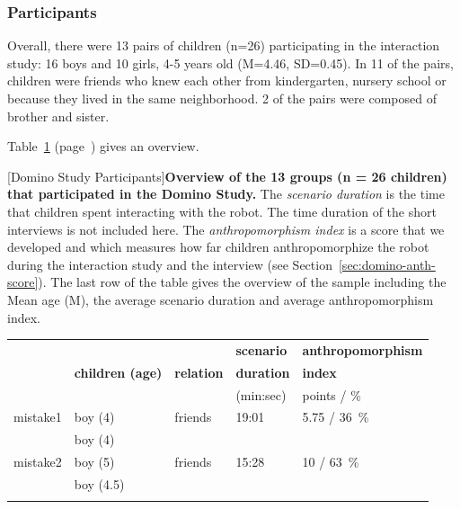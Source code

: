 \documentclass{sig-alternate}
\begin{document}
\subsubsection{Participants}

Overall, there were 13 pairs of children (n=26) participating in the interaction
study: 16 boys and 10 girls, 4-5 years old (M=4.46, SD=0.45). In 11 of the
pairs, children were friends who knew each other from kindergarten, nursery
school or because they lived in the same neighborhood. 2 of the pairs were
composed of brother and sister.

Table~\ref{tab:domino-sample} (page~\pageref{tab:domino-sample}) gives an
overview.

\begin{table}[H]
[Domino Study Participants]{\small \textbf{Overview of the 13 groups (n = 26 children) that participated in the Domino Study.} The \textit{scenario duration} is the time that children spent interacting with the robot. The time duration of the short interviews is not included here. The \textit{anthropomorphism index} is a score that we developed and which measures how far children anthropomorphize the robot during the interaction study and the interview (see Section~\ref{sec:domino-anth-score}). The last row of the table gives the overview of the sample including the Mean age (M), the average scenario duration and average anthropomorphism index.}
\label{tab:domino-sample}       %
\centering
\footnotesize

\begin{tabular}{lllll}
\hline\noalign{\smallskip}
	\multirow{3}{*}{\textbf{group}} & \multirow{3}{*}{\textbf{children (age)}} & \multirow{3}{*}{\textbf{relation}} & \textbf{scenario} & \textbf{anthropomorphism} \\
	 & & & \textbf{duration} & \textbf{index} \\
	 & & & (min:sec) & points / \% \\
\noalign{\smallskip}\hline\hline\noalign{\smallskip}

	mistake1 & boy (4) & friends & 19:01 & 5.75 / 36~\% \\ 
	& boy (4) & & & \\ 
\noalign{\smallskip} \hline \noalign{\smallskip}

	mistake2 & boy (5) & friends & 15:28 & 10 / 63~\% \\
	& boy (4.5) & & & \\ 
\noalign{\smallskip} \hline \noalign{\smallskip}


\end{tabular}
\end{table}
\end{document}
